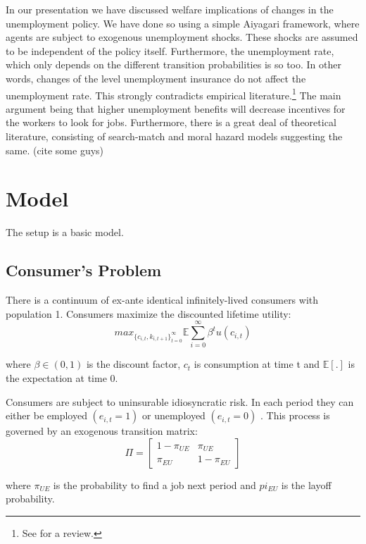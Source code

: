 \documentclass[a4paper,12pt]{article}
\begin{document}
In our presentation we have discussed welfare implications of changes in the unemployment policy. We have done so using a simple Aiyagari framework, where agents are subject to exogenous unemployment shocks. These shocks are assumed to be independent of the policy itself. Furthermore, the unemployment rate, which only depends on the different transition probabilities is so too. In other words, changes of the level unemployment insurance do not affect the unemployment rate. This strongly contradicts empirical literature.\footnote{See \citep{decker} for a review.} The main argument being that higher unemployment benefits will decrease incentives for the workers to look for jobs. Furthermore, there is a great deal of theoretical literature, consisting of search-match and moral hazard models suggesting the same. (cite some guys) 







\section{Model}

The setup is a basic \cite{aiyagari} model. 

\subsection{Consumer's Problem}

There is a continuum of ex-ante identical infinitely-lived consumers with population 1. Consumers maximize the discounted lifetime utility: 
\[ 
 max_{\{{ c_{i,t}, k_{i,t+1} }\}_{t = 0}^{\infty}} {\mathbb{E}} \sum_{i=0}^{\infty} \beta^{t}  u(c_{i,t}) 
 \]

where $\beta \in (0,1)$ is the discount factor, $ c_{t}$ is consumption at time t and $\mathbb{E[.]}$ is the expectation at time 0. 

Consumers are subject to uninsurable idiosyncratic risk. In each period they can either be employed $(e_{i,t}=1)$ or unemployed $(e_{i,t}=0)$ . This process is governed by an exogenous transition matrix:
\[ \Pi = \begin{bmatrix}
1-\pi_{UE} & \pi_{UE} \\
 \pi_{EU} & 1-\pi_{EU}
\end{bmatrix}
\]

where $\pi_{UE}$ is the probability to find a job next period and $pi_{EU}$ is the layoff probability. 
\end{document}
